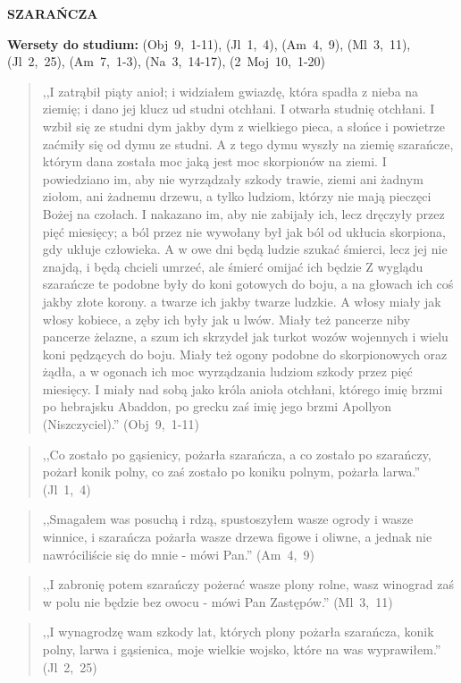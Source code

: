 \documentclass[10pt,a4paper,oneside]{article}
\begin{document}
\centerline{\textbf{\MakeUppercase{Szarańcza}}}
\begin{center}
\textbf{Wersety do studium:} (Obj~9,~1-11), (Jl~1,~4), (Am~4,~9), (Ml~3,~11), (Jl~2,~25), (Am~7,~1-3), (Na~3,~14-17), (2~Moj~10,~1-20)
\end{center}
\begin{quote}
,,I zatrąbił piąty anioł; i widziałem gwiazdę, która spadła z nieba na ziemię; i dano jej klucz ud studni otchłani. I otwarła studnię otchłani. I wzbił się ze studni dym jakby dym z wielkiego pieca, a słońce i powietrze zaćmiły się od dymu ze studni. A z tego dymu wyszły na ziemię szarańcze, którym dana została moc jaką jest moc skorpionów na ziemi. I powiedziano im, aby nie wyrządzały szkody trawie, ziemi ani żadnym ziołom, ani żadnemu drzewu, a tylko ludziom, którzy nie mają pieczęci Bożej na czołach. I nakazano im, aby nie zabijały ich, lecz dręczyły przez pięć miesięcy; a ból przez nie wywołany był jak ból od ukłucia skorpiona, gdy ukłuje człowieka. A w owe dni będą ludzie szukać śmierci, lecz jej nie znajdą, i będą chcieli umrzeć, ale śmierć omijać ich będzie Z wyglądu szarańcze te podobne były do koni gotowych do boju, a na głowach ich coś jakby złote korony. a twarze ich jakby twarze ludzkie. A włosy miały jak włosy kobiece, a zęby ich były jak u lwów. Miały też pancerze niby pancerze żelazne, a szum ich skrzydeł jak turkot wozów wojennych i wielu koni pędzących do boju. Miały też ogony podobne do skorpionowych oraz żądła, a w ogonach ich moc wyrządzania ludziom szkody przez pięć miesięcy. I miały nad sobą jako króla anioła otchłani, którego imię brzmi po hebrajsku Abaddon, po grecku zaś imię jego brzmi Apollyon (Niszczyciel).'' (Obj~9,~1-11)
\end{quote}
\begin{quote}
,,Co zostało po gąsienicy, pożarła szarańcza, a co zostało po szarańczy, pożarł konik polny, co zaś zostało po koniku polnym, pożarła larwa.'' (Jl~1,~4)
\end{quote}
\begin{quote}
,,Smagałem was posuchą i rdzą, spustoszyłem wasze ogrody i wasze winnice, i szarańcza pożarła wasze drzewa figowe i oliwne, a jednak nie nawróciliście się do mnie - mówi Pan.'' (Am~4,~9)
\end{quote}
\begin{quote}
,,I zabronię potem szarańczy pożerać wasze plony rolne, wasz winograd zaś w polu nie będzie bez owocu - mówi Pan Zastępów.'' (Ml~3,~11)
\end{quote}
\begin{quote}
,,I wynagrodzę wam szkody lat, których plony pożarła szarańcza, konik polny, larwa i gąsienica, moje wielkie wojsko, które na was wyprawiłem.'' (Jl~2,~25)
\end{quote}
\end{document}
